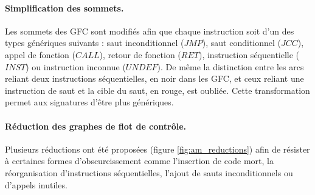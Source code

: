 \paragraph{Simplification des sommets.}
Les sommets des GFC sont modifiés afin que chaque instruction soit d'un des types génériques suivants : saut inconditionnel ($JMP$), saut conditionnel ($JCC$), appel de fonction ($CALL$), retour de fonction ($RET$), instruction séquentielle ($INST$) ou instruction inconnue ($UNDEF$). De même la distinction entre les arcs reliant deux instructions séquentielles, en noir dans les GFC, et ceux reliant une instruction de saut et la cible du saut, en rouge, est oubliée.
Cette transformation permet aux signatures d'être plus génériques.

\paragraph{Réduction des graphes de flot de contrôle.}
Plusieurs réductions ont été proposées (figure \ref{fig:am_reductions}) afin de résister à certaines formes d'obscurcissement comme l'insertion de code mort, la réorganisation d'instructions séquentielles, l'ajout de sauts inconditionnels ou d'appels inutiles.

